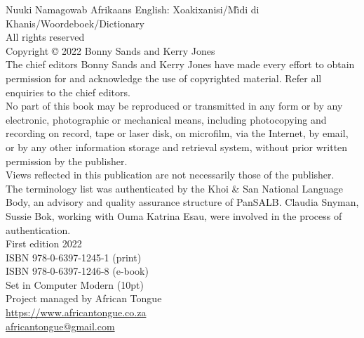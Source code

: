 \newpage

\thispagestyle{empty}

\hfill
\vfill

N\textipa{\textvertline}uuki Namagowab Afrikaans English:
\textipa{\textdoublebarpipe}Xoaki\textipa{\textdoublebarpipe}xanisi/M\^{\i}di
di \textipa{\textdoublebarpipe}Khanis/Woordeboek/Dictionary\\[1em]


All rights reserved\\[1em]


Copyright \copyright{} 2022 Bonny Sands and Kerry Jones\\[1em]


The chief editors Bonny Sands and Kerry Jones have made every effort
to obtain permission for and acknowledge the use of copyrighted
material. Refer all enquiries to the chief editors.\\[1em]


No part of this book may be reproduced or transmitted in any form or
by any electronic, photographic or mechanical means, including
photocopying and recording on record, tape or laser disk, on
microfilm, via the Internet, by email, or by any other information
storage and retrieval system, without prior written permission by the
publisher.\\[1em]

Views reflected in this publication are not necessarily those of the
publisher.\\[1em]

The terminology list was authenticated by the Khoi \& San National
Language Body, an advisory and quality assurance structure of PanSALB.
Claudia Snyman, Sussie Bok, working with Ouma Katrina Esau, were
involved in the process of authentication.\\[1em]

First edition 2022\\[1em]

ISBN 978-0-6397-1245-1 (print)\\
ISBN 978-0-6397-1246-8 (e-book)\\[1em]

Set in Computer Modern (10pt)\\[1em]

Project managed by African Tongue\\
\url{https://www.africantongue.co.za}\\
\url{africantongue@gmail.com}\\[1em]

